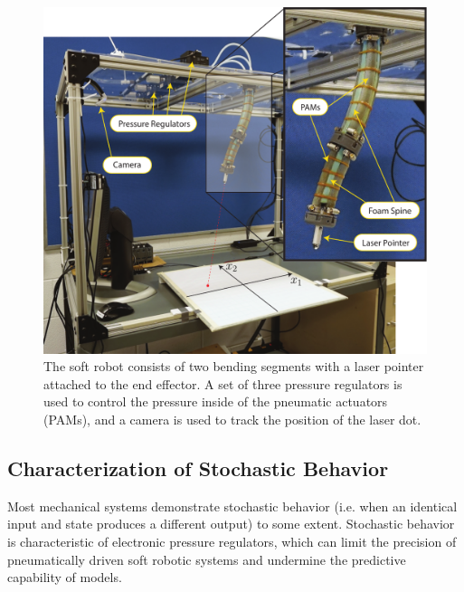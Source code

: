 \begin{figure}
    \centering
    \includegraphics[width=\linewidth]{figures/rig_N_robot_smaller.pdf}
    \caption{The soft robot consists of two bending segments with a laser pointer attached to the end effector. A set of three pressure regulators is used to control the pressure inside of the pneumatic actuators (PAMs), and a camera is used to track the position of the laser dot.}
    \label{fig:rig}
\end{figure}

\subsection{Characterization of Stochastic Behavior}
\label{sec:noise}

Most mechanical systems demonstrate stochastic behavior (i.e. when an identical input and state produces a different output) to some extent.
Stochastic behavior is characteristic of electronic pressure regulators, which can limit the precision of pneumatically driven soft robotic systems
and undermine the predictive capability of models.


